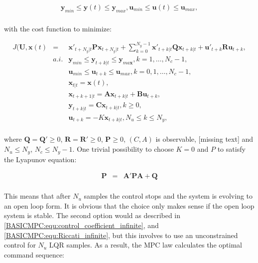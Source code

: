 		\begin{equation}
        \begin{array}{c}
				\textbf{y}_{min}\leq \textbf{y}(t)\leq \textbf{y}_{max},\textbf{u}_{min}\leq \textbf{u}(t)\leq \textbf{u}_{max},\\
        \end{array}
        \label{BASICMPC:equ:receiding_horison_constraints}
    \end{equation}
		
		
with the cost function to minimize:
		
		\begin{equation}
        \begin{array}{rcl}
				J(\textbf{U},\textbf{x}(t)&=&\textbf{x}'_{t+N_y|t}\textbf{P}\textbf{x}_{t+N_y|t}+\sum^{N_y-1}_{k=0}\textbf{x}'_{t+k|t}\textbf{Q}\textbf{x}_{t+k|t}+\textbf{u}'_{t+k}\textbf{R}\textbf{u}_{t+k},\\
				&a.i.&\textbf{y}_{min}\leq \textbf{y}_{t+k|t}\leq \textbf{y}_{ma\textbf{x}},k=1,\dots,N_c-1,\\
				&&\textbf{u}_{min}\leq \textbf{u}_{t+k}\leq \textbf{u}_{max},k=0,1,\dots,N_c-1,\\
				&&\textbf{x}_{t|t}=\textbf{x}(t),\\
				&&\textbf{x}_{t+k+1|t}=\textbf{A}\textbf{x}_{t+k|t}+\textbf{B}\textbf{u}_{t+k},\\
				&&\textbf{y}_{t+k|t}=\textbf{C}\textbf{x}_{t+k|t}, k\geq0,\\
				&&\textbf{u}_{t+k}=-K\textbf{x}_{t+k|t}, N_u\leq k\leq N_y,\\
        \end{array}
        \label{BASICMPC:equ:receiding_horison_problem}
    \end{equation}
		
		where $\textbf{Q}=\textbf{Q}'\geq0$, $\textbf{R}=\textbf{R}'\geq0$, $\textbf{P}\geq0$, $(C,A)$ is observable, [missing text] and $N_u\leq N_y$, $N_c\leq N_y-1$. One trivial possibility to choose $K=0$ and $P$ to satisfy the Lyapunov equation:
		
		\begin{equation}
        \begin{array}{rcl}
				\textbf{P}&=&\textbf{A}'\textbf{PA}+\textbf{Q}\\
        \end{array}
        \label{BASICMPC:equ:receiding_horison_Lyapunov}
    \end{equation}
		
		This means that after $N_u$ samples the control stops and the system is evolving to an open loop form. It is obvious that the choice only makes sense if the open loop system is stable. The second option would as described in \ref{BASICMPC:equ:control_coefficient_infinite}, and \ref{BASICMPC:equ:Riccati_infinite}, but this involves to use an unconstrained control for $N_u$ LQR samples. As a result, the MPC law calculates the optimal command sequence:
		
